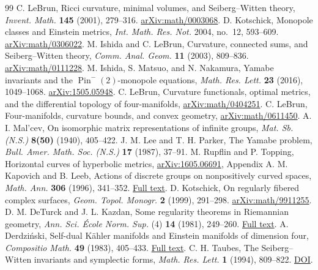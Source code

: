 \begin{thebibliography}{99}
 C. LeBrun, Ricci curvature, minimal volumes, and
Seiberg--Witten theory, \emph{Invent. Math.} \textbf{145} (2001), 279--316.
\href{https://arxiv.org/abs/math/0003068}{arXiv:math/0003068}.
 D. Kotschick, Monopole classes and Einstein
metrics, \emph{Int. Math. Res. Not.} 2004, no.~12, 593--609.
\href{https://arxiv.org/abs/math/0306022}{arXiv:math/0306022}.
 M. Ishida and C. LeBrun, Curvature,
connected sums, and Seiberg--Witten theory,
\emph{Comm. Anal. Geom.} \textbf{11} (2003), 809--836.
\href{https://arxiv.org/abs/math/0111228}{arXiv:math/0111228}.
 M. Ishida, S. Matsuo, and N. Nakamura, Yamabe
invariants and the $\operatorname{Pin}^{-}(2)$-monopole equations,
\emph{Math. Res. Lett.} \textbf{23} (2016), 1049--1068.
\href{https://arxiv.org/abs/1505.05948}{arXiv:1505.05948}.
 C. LeBrun, Curvature functionals, optimal metrics,
and the differential topology of four-manifolds,
\href{https://arxiv.org/abs/math/0404251}{arXiv:math/0404251}.
 C. LeBrun, Four-manifolds, curvature bounds,
and convex geometry,
\href{https://arxiv.org/abs/math/0611450}{arXiv:math/0611450}.
 A. I. Mal'cev, On isomorphic matrix
representations of infinite groups, \emph{Mat. Sb. (N.S.)}
\textbf{8(50)} (1940), 405--422.
 J. M. Lee and T. H. Parker, The Yamabe
problem, \emph{Bull. Amer. Math. Soc. (N.S.)} \textbf{17} (1987), 37--91.
 M. Rupflin and P. Topping,
Horizontal curves of hyperbolic metrics,
\href{https://arxiv.org/abs/1605.06691}{arXiv:1605.06691}, Appendix A.
 M. Kapovich and B. Leeb,
Actions of discrete groups on nonpositively curved spaces,
\emph{Math. Ann.} \textbf{306} (1996), 341--352.
\href{https://www.math.ucdavis.edu/~kapovich/EPR/KL_1996.pdf}{Full text}.
 D. Kotschick,
On regularly fibered complex surfaces,
\emph{Geom. Topol. Monogr.} \textbf{2} (1999), 291--298.
\href{https://arxiv.org/abs/math/9911255}{arXiv:math/9911255}.
 D. M. DeTurck and J. L. Kazdan,
Some regularity theorems in Riemannian geometry,
\emph{Ann. Sci. \'Ecole Norm. Sup.} (4) \textbf{14} (1981), 249--260.
\href{https://www.numdam.org/item/10.24033/asens.1405/}{Full text}.
 A. Derdzi\'nski,
Self-dual K\"ahler manifolds and Einstein manifolds of dimension four,
\emph{Compositio Math.} \textbf{49} (1983), 405--433.
\href{https://www.numdam.org/item/CM_1983__49_3_405_0/}{Full text}.
 C. H. Taubes,
The Seiberg--Witten invariants and symplectic forms,
\emph{Math. Res. Lett.} \textbf{1} (1994), 809--822.
\href{https://doi.org/10.4310/MRL.1994.v1.n6.a15}{DOI}.
\end{thebibliography}

